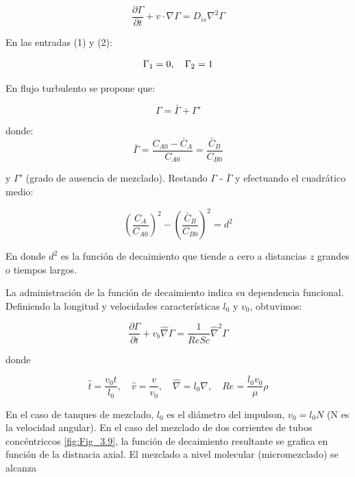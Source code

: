 \begin{equation}
    \frac{\partial \Gamma}{\partial t} + v \cdot \nabla \Gamma = D_{is} \nabla^2 \Gamma
\end{equation}

En las entradas (1) y (2):

\begin{equation}
    \Gamma_1 = 0, \quad \Gamma_2 = 1 \notag
\end{equation}

En flujo turbulento se propone que:

\begin{equation}
    \Gamma = \bar{\Gamma} + \Gamma'
\end{equation}

donde:
\begin{equation}
   \bar{\Gamma} = \frac{C_{A0} - \bar{C}_A}{C_{A0}} = \frac{\bar{C}_B}{C_{B0}}
\end{equation}




y $\Gamma'$ (grado de ausencia de mezclado). Restando $\Gamma$ - $\bar{\Gamma}$  y efectuando el cuadrático medio:

\begin{equation}
    \left( \frac{C_A}{C_{A0}} \right)^2 - \left( \frac{\bar{C}_B}{C_{B0}} \right)^2 = d^2
\end{equation}

En donde $d^2$ es la función de decaimiento que tiende a cero a distancias $z$ grandes o tiempos largos.


La administración de la función de decaimiento indica su dependencia funcional. Definiendo la longitud y velocidades características $l_{0}$ y $v_{0}$, obtuvimos:

\begin{equation}
    \frac{\partial\Gamma}{\partial t} + v_{b}\hat{\nabla}\Gamma = \frac{1}{Re Sc}\hat{\nabla}^{2}\Gamma  \label{eq_3.89}
\end{equation}


donde 

\begin{equation}
      \hat{t}=\frac{v_0t}{l_0}, \quad 
      \hat{v}=\frac{v}{v_0},\quad
      \hat{\nabla}=l_0\nabla, \quad
       Re=\frac{l_0v_0}{\mu}\rho 
\end{equation}

En el caso de tanques de mezclado, $l_0$ es el diámetro del impulson, $v_0=l_0N$ (N es la velocidad angular). En el caso del mezclado de dos corrientes de tubos concéntriccos \eqref{fig:Fig_3.9}, la función de decaimiento resultante se grafica en función de la distnacia axial. El mezclado a nivel molecular (micromezclado) se alcanza

